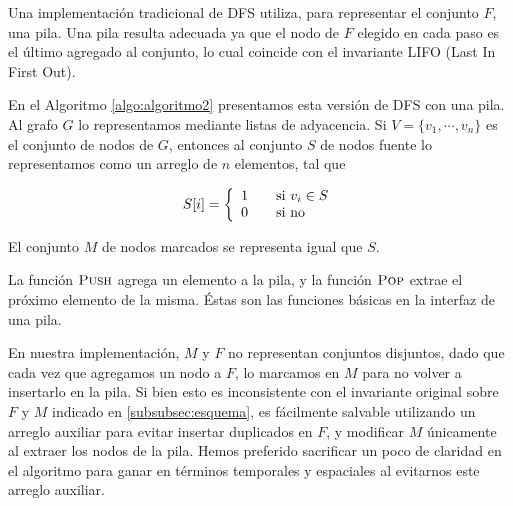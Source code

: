 Una implementación tradicional de DFS utiliza, para representar el conjunto $F$, una pila. Una pila resulta adecuada ya que el nodo de $F$ elegido en cada paso es el último agregado al conjunto, lo cual coincide con el invariante LIFO (Last In First Out).

En el Algoritmo \ref{algo:algoritmo2} presentamos esta versión de DFS con una pila. Al grafo $G$ lo representamos mediante listas de adyacencia. Si $V = \{v_1, \cdots, v_n\}$ es el conjunto de nodos de $G$, entonces al conjunto $S$ de nodos fuente lo representamos como un arreglo de $n$ elementos, tal que 

\[S[i] = \left\{ 
  \begin{array}{l l}
    1 & \quad \text{si } v_i \in S\\
    0 & \quad \text{si no}
  \end{array} \right.
\]

El conjunto $M$ de nodos marcados se representa igual que $S$.

\begin{algorithm}
	\dontprintsemicolon
 	\BlankLine
\caption{$\textsc{Iterative-DFS}$}
\label{algo:algoritmo2}
\end{algorithm}

La función $\textsc{Push}$ agrega un elemento a la pila, y la función $\textsc{Pop}$ extrae el próximo elemento de la misma. Éstas son las funciones básicas en la interfaz de una pila.

En nuestra implementación, $M$ y $F$ no representan conjuntos disjuntos, dado que cada vez que agregamos un nodo a $F$, lo marcamos en $M$ para no volver a insertarlo en la pila. Si bien esto es inconsistente con el invariante original sobre $F$ y $M$ indicado en \ref{subsubsec:esquema}, es fácilmente salvable utilizando un arreglo auxiliar para evitar insertar duplicados en $F$, y modificar $M$ únicamente al extraer los nodos de la pila. Hemos preferido sacrificar un poco de claridad en el algoritmo para ganar en términos temporales y espaciales al evitarnos este arreglo auxiliar.

